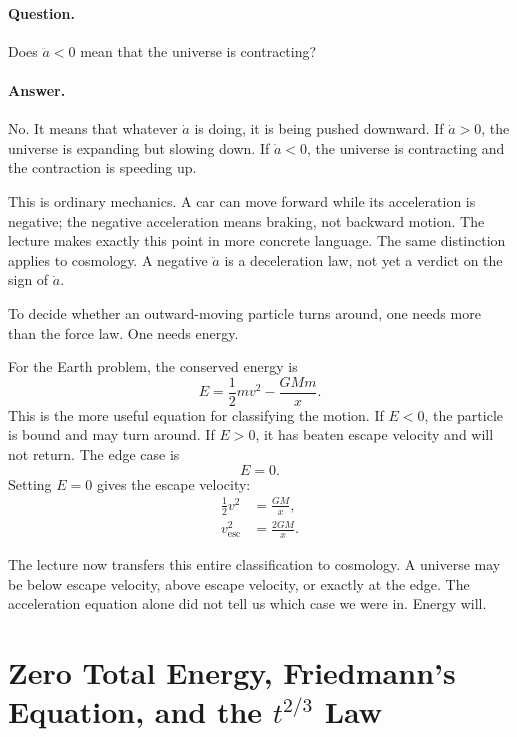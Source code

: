 \paragraph{Question.} Does \(\ddot a<0\) mean that the universe is contracting?

\paragraph{Answer.} No. It means that whatever \(\dot a\) is doing, it is being pushed downward. If \(\dot a>0\), the universe is expanding but slowing down. If \(\dot a<0\), the universe is contracting and the contraction is speeding up.

This is ordinary mechanics. A car can move forward while its acceleration is negative; the negative acceleration means braking, not backward motion. The lecture makes exactly this point in more concrete language. The same distinction applies to cosmology. A negative \(\ddot a\) is a deceleration law, not yet a verdict on the sign of \(\dot a\).

To decide whether an outward-moving particle turns around, one needs more than the force law. One needs energy.

For the Earth problem, the conserved energy is
\begin{equation}
E=\frac12 mv^2-\frac{GMm}{x}.
\end{equation}
This is the more useful equation for classifying the motion. If \(E<0\), the particle is bound and may turn around. If \(E>0\), it has beaten escape velocity and will not return. The edge case is
\begin{equation}
E=0.
\end{equation}
Setting \(E=0\) gives the escape velocity:
\begin{align}
\frac12 v^2&=\frac{GM}{x},\\
v_{\mathrm{esc}}^2&=\frac{2GM}{x}.
\end{align}

The lecture now transfers this entire classification to cosmology. A universe may be below escape velocity, above escape velocity, or exactly at the edge. The acceleration equation alone did not tell us which case we were in. Energy will.

\section{Zero Total Energy, Friedmann's Equation, and the \(t^{2/3}\) Law}

